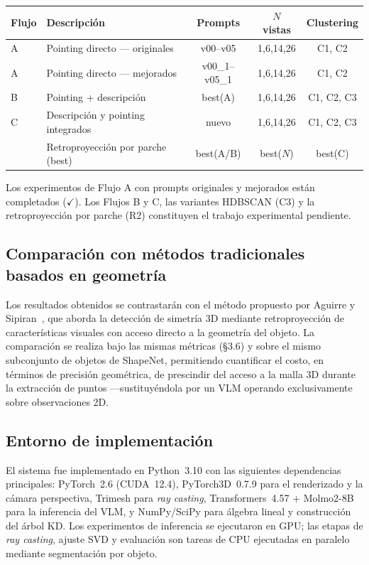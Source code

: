 \begin{center}
\begin{tabular}{llccc}
\toprule
Flujo & Descripción & Prompts & $N$ vistas & Clustering \\
\midrule
A & Pointing directo — originales      & v00--v05   & 1,6,14,26 & C1, C2 \\
A & Pointing directo — mejorados       & v00\_1--v05\_1 & 1,6,14,26 & C1, C2 \\
B & Pointing + descripción             & best(A)    & 1,6,14,26 & C1, C2, C3 \\
C & Descripción y pointing integrados   & nuevo      & 1,6,14,26 & C1, C2, C3 \\
\midrule
  & Retroproyección por parche (best)  & best(A/B)  & best($N$) & best(C) \\
\bottomrule
\end{tabular}
\end{center}

Los experimentos de Flujo A con prompts originales y mejorados están completados
($\checkmark$). Los Flujos B y C, las variantes HDBSCAN (C3) y la retroproyección
por parche (R2) constituyen el trabajo experimental pendiente.

\subsection{Comparación con métodos tradicionales basados en geometría}

Los resultados obtenidos se contrastarán con el método propuesto por Aguirre y
Sipiran~\cite{aguirre_sipiran}, que aborda la detección de simetría 3D mediante
retroproyección de características visuales con acceso directo a la geometría del
objeto. La comparación se realiza bajo las mismas métricas (§3.6) y sobre el
mismo subconjunto de objetos de ShapeNet, permitiendo cuantificar el costo, en
términos de precisión geométrica, de prescindir del acceso a la malla 3D durante
la extracción de puntos —sustituyéndola por un VLM operando exclusivamente sobre
observaciones 2D.

\newpage
\subsection*{Entorno de implementación}

El sistema fue implementado en Python~3.10 con las siguientes dependencias
principales: PyTorch~2.6 (CUDA~12.4), PyTorch3D~0.7.9 para el renderizado y la
cámara perspectiva, Trimesh para \textit{ray casting}, Transformers~4.57 +
Molmo2-8B para la inferencia del VLM, y NumPy/SciPy para álgebra lineal y
construcción del árbol KD. Los experimentos de inferencia se ejecutaron en GPU;
las etapas de \textit{ray casting}, ajuste SVD y evaluación son tareas de CPU
ejecutadas en paralelo mediante segmentación por objeto.

